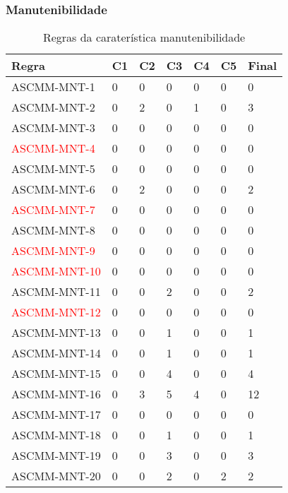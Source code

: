 \documentclass[openany,10pt,a4paper]{article}
\begin{document}
\subsubsection{Manutenibilidade}
	\begin{longtable}{p{1.2in}|p{0.28in}|p{0.28in}|p{0.28in}|p{0.28in}|p{0.28in}|p{0.35in}}
		\caption{Regras da caraterística manutenibilidade}
		\label{variability_impl_mech}
		\endhead
		\hline
		\textbf{Regra} & \textbf{C1} & \textbf{C2} & \textbf{C3} & \textbf{C4} & \textbf{C5} & \textbf{Final} \\ \hline
		ASCMM-MNT-1 & 0 & 0 & 0 & 0 & 0 & 0 \\ \hline
		ASCMM-MNT-2 & 0 & 2 & 0 & 1 & 0 & 3 \\ \hline
		ASCMM-MNT-3 & 0 & 0 & 0 & 0 & 0 & 0 \\ \hline
		\textcolor{red}{ASCMM-MNT-4} & 0 & 0 & 0 & 0 & 0 & 0 \\ \hline
		ASCMM-MNT-5 & 0 & 0 & 0 & 0 & 0 & 0 \\ \hline
		ASCMM-MNT-6 & 0 & 2 & 0 & 0 & 0 & 2 \\ \hline
		\textcolor{red}{ASCMM-MNT-7} & 0 & 0 & 0 & 0 & 0 & 0 \\ \hline
		ASCMM-MNT-8 & 0 & 0 & 0 & 0 & 0 & 0 \\ \hline
		\textcolor{red}{ASCMM-MNT-9} & 0 & 0 & 0 & 0 & 0 & 0 \\ \hline
		\textcolor{red}{ASCMM-MNT-10} & 0 & 0 & 0 & 0 & 0 & 0 \\ \hline
		ASCMM-MNT-11 & 0 & 0 & 2 & 0 & 0 & 2 \\ \hline
		\textcolor{red}{ASCMM-MNT-12} & 0 & 0 & 0 & 0 & 0 & 0 \\ \hline
		ASCMM-MNT-13 & 0 & 0 & 1 & 0 & 0 & 1 \\ \hline
		ASCMM-MNT-14 & 0 & 0 & 1 & 0 & 0 & 1 \\ \hline
		ASCMM-MNT-15 & 0 & 0 & 4 & 0 & 0 & 4 \\ \hline
		ASCMM-MNT-16 & 0 & 3 & 5 & 4 & 0 & 12 \\ \hline
		ASCMM-MNT-17 & 0 & 0 & 0 & 0 & 0 & 0 \\ \hline
		ASCMM-MNT-18 & 0 & 0 & 1 & 0 & 0 & 1 \\ \hline
		ASCMM-MNT-19 & 0 & 0 & 3 & 0 & 0 & 3 \\ \hline
		ASCMM-MNT-20 & 0 & 0 & 2 & 0 & 2 & 2 \\ \hline
	\end{longtable} 
\end{document}
